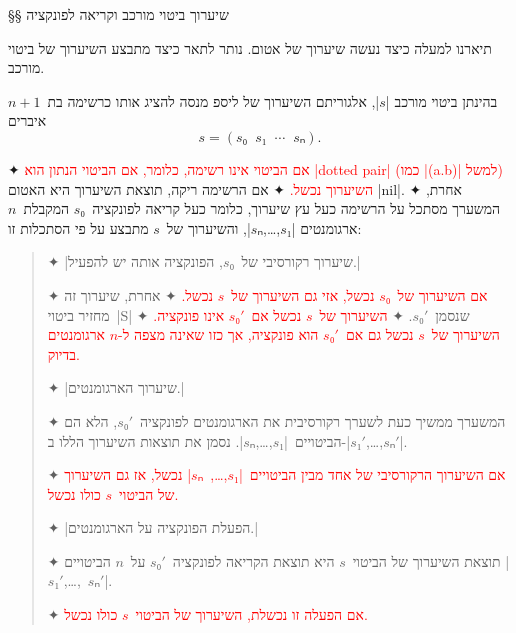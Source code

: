 §§ שיערוך ביטוי מורכב וקריאה לפונקציה

תיארנו למעלה כיצד נעשה שיערוך של אטום. נותר לתאר כיצד מתבצע השיערוך של ביטוי
מורכב.

\minipage\textwidth
\newcommand\exception[1]{{\textcolor{red}{#1}}}
\begin{mdframed}[backgroundcolor=Lavender!20]
  \footnotesize
  בהינתן ביטוי מורכב \E|$s$|, אלגוריתם השיערוך של ליספ מנסה
  להציג אותו כרשימה בת~$n+1$ איברים \[
    s=(s₀\;\;s₁\;\;⋯\;\;sₙ).
\] \begin{enumerate}
    ✦ \exception{
      אם הביטוי אינו רשימה, כלומר, אם הביטוי הנתון הוא \E|dotted pair| (כמו
      \E|(a.b)| למשל) השיערוך נכשל.}
    ✦ אם הרשימה ריקה, תוצאת השיערוך היא האטום \T|nil|.
    ✦ אחרת, המשערך מסתכל על הרשימה כעל עץ שיערוך, כלומר כעל קריאה
    לפונקציה~$s₀$ המקבלת~$n$ ארגומנטים \E|$s₁$,…,$sₙ$|, והשיערוך של~$s$ מתבצע
    על פי הסתכלות זו:
    \begin{quote}
      \begin{enumerate}
        ✦ \ע|שיערוך רקורסיבי של~$s₀$, הפונקציה אותה יש להפעיל.|
        \begin{itemize}
          ✦ \exception{אם השיערוך של~$s₀$ נכשל, אזי גם השיערוך של~$s$ נכשל.}
          ✦ אחרת, שיערוך זה מחזיר ביטוי~\E|S| שנסמן~$s₀'$.
          ✦ \exception{השיערוך של~$s$ נכשל אם~$s₀'$ אינו פונקציה.}
          ✦ \exception{השיערוך של~$s$ נכשל גם אם~$s₀'$ הוא פונקציה, אך כזו שאינה מצפה ל-$n$ ארגומנטים בדיוק.}
        \end{itemize}
        ✦ \ע|שיערוך הארגומנטים.|
        \begin{itemize}
          ✦ המשערך ממשיך כעת לשערך רקורסיבית את הארגומנטים לפונקציה~$s₀'$,
          הלא הם הביטויים~\E|$s₁$,…,$sₙ$|. נסמן את תוצאות השיערוך הללו
          ב-\E|$s₁'$,…,$sₙ'$|.

          ✦ \exception{אם השיערוך הרקורסיבי של אחד מבין
            הביטויים~\E|$s₁$,…,~$sₙ$| נכשל, אז גם השיערוך של הביטוי~$s$ כולו
            נכשל.}
        \end{itemize}

        ✦ \ע|הפעלת הפונקציה על הארגומנטים.|

        \begin{itemize}
          ✦ תוצאת השיערוך של הביטוי~$s$ היא תוצאת הקריאה לפונקציה~$s₀'$
          על~$n$ הביטויים \E|$s₁'$,…,~$sₙ'$|.

          ✦ \exception{אם הפעלה זו נכשלת, השיערוך של הביטוי~$s$ כולו נכשל.}
        \end{itemize}
      \end{enumerate}
    \end{quote}
  \end{enumerate}
\end{mdframed}
\endminipage

